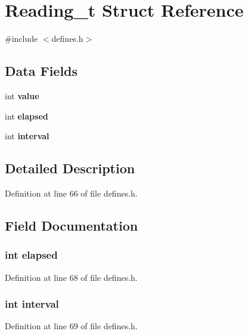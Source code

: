 \section{Reading\-\_\-t Struct Reference}
\label{struct_reading__t}


{\ttfamily \#include $<$defines.\-h$>$}

\subsection*{Data Fields}
\begin{DoxyCompactItemize}
\item 
int {\bf value}
\item 
int {\bf elapsed}
\item 
int {\bf interval}
\end{DoxyCompactItemize}


\subsection{Detailed Description}


Definition at line 66 of file defines.\-h.



\subsection{Field Documentation}
\subsubsection[{elapsed}]{\setlength{\rightskip}{0pt plus 5cm}int elapsed}\label{struct_reading__t_a4bd3978f9fa83a0e08225dca54a00eb6}


Definition at line 68 of file defines.\-h.

\subsubsection[{interval}]{\setlength{\rightskip}{0pt plus 5cm}int interval}\label{struct_reading__t_ae0c690118932b32ef40a74bb6a259acd}


Definition at line 69 of file defines.\-h.

